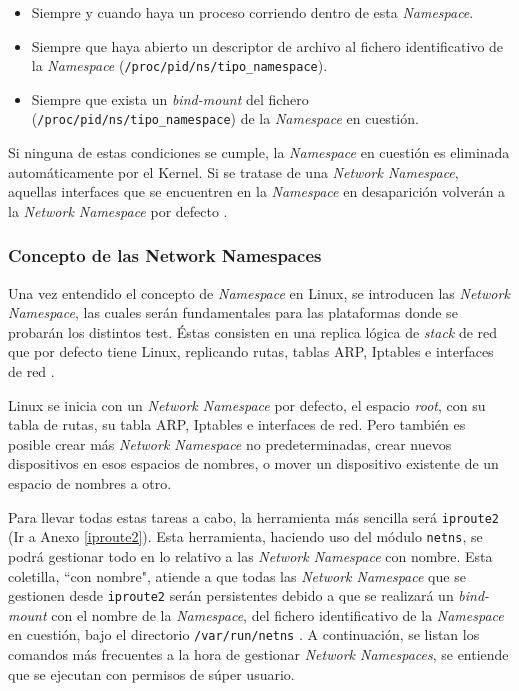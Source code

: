 \begin{itemize}
    \item Siempre y cuando haya un proceso corriendo dentro de esta \textit{Namespace}.
    \item Siempre que haya abierto un descriptor de archivo al fichero identificativo de la \textit{Namespace} (\texttt{/proc/{pid}/ns/{tipo\_namespace}}).
    \item Siempre que exista un \textit{bind-mount} del fichero (\texttt{/proc/{pid}/ns/{tipo\_namespace}}) de la \textit{Namespace} en cuestión.
\end{itemize}

Si ninguna de estas condiciones se cumple, la \textit{Namespace} en cuestión es eliminada automáticamente por el Kernel. Si se tratase de una \textit{Network Namespace}, aquellas interfaces que se encuentren en la \textit{Namespace} en desaparición volverán a la \textit{Network Namespace} por defecto \cite{ns}.

\subsubsection{Concepto de las Network Namespaces}

Una vez entendido el concepto de \textit{Namespace} en Linux, se introducen las \textit{Network Namespace}, las cuales serán fundamentales para las plataformas donde se probarán los distintos test. Éstas consisten en una replica lógica de \textit{stack} de red que por defecto tiene Linux, replicando rutas, tablas ARP, Iptables e interfaces de red \cite{netns}. \\
\par
Linux se inicia con un \textit{Network Namespace} por defecto, el espacio \textit{root}, con su tabla de rutas, su tabla ARP,  Iptables e interfaces de red. Pero también es posible crear más \textit{Network Namespace} no predeterminadas,  crear nuevos dispositivos en esos espacios de nombres, o mover un dispositivo existente de un espacio de nombres a otro. \\
\par
Para llevar todas estas tareas a cabo, la herramienta más sencilla será \texttt{iproute2} (Ir a Anexo \ref{iproute2}). Esta herramienta, haciendo uso del módulo \texttt{netns}, se podrá gestionar todo en lo relativo a las \textit{Network Namespace} con nombre. Esta coletilla, ``con nombre", atiende a que todas las \textit{Network Namespace} que se gestionen desde \texttt{iproute2} serán persistentes debido a que se realizará un \textit{bind-mount} con el nombre de la \textit{Namespace}, del fichero identificativo de la \textit{Namespace} en cuestión, bajo el directorio \texttt{/var/run/netns} . A continuación, se listan los comandos más frecuentes a la hora de gestionar \textit{Network Namespaces}, se entiende que se ejecutan con permisos de súper usuario.

